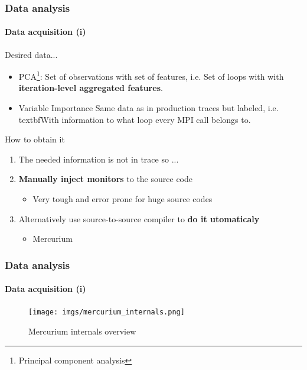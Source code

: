 \documentclass{beamer}
\begin{document}
\begin{frame}
\frametitle{Data analysis}
\framesubtitle{Data acquisition (i)}
Desired data...\\
\begin{itemize}
\item PCA\footnote{Principal component analysis}: Set of observations with set of features, i.e. Set of loops with with \textbf{iteration-level aggregated features}. 
\item Variable Importance Same data as in production traces but labeled, i.e. textbf{With information to what loop every MPI call belongs to}.
\end{itemize}
How to obtain it\\
\begin{enumerate}
\item The needed information is not in trace so ...
\item \textbf{Manually inject monitors} to the source code
\begin{itemize}
	\item Very tough and error prone for huge source codes
\end{itemize}
\item Alternatively use source-to-source compiler to \textbf{do it utomaticaly}
\begin{itemize}
	\item Mercurium
\end{itemize}
\end{enumerate}
\end{frame}

\begin{frame}
\frametitle{Data analysis}
\framesubtitle{Data acquisition (i)}
\begin{figure}
\texttt{[image: imgs/mercurium\_internals.png]}
\caption{Mercurium internals overview}
\end{figure}
\end{frame}
\end{document}
